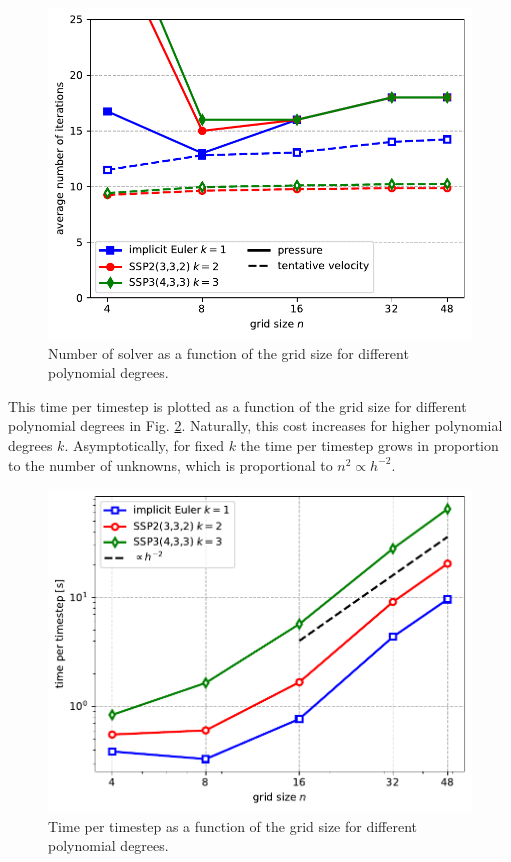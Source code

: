 \documentclass[11pt]{article}
\begin{document}
\begin{figure}
    \begin{center}
        \includegraphics[width=0.75\linewidth]{figures/niter.pdf}
        \caption{Number of solver as a function of the grid size for different polynomial degrees.}
        \label{fig:niter}
    \end{center}
\end{figure}
This time per timestep is plotted as a function of the grid size for different polynomial degrees in Fig. \ref{fig:titer}. Naturally, this cost increases for higher polynomial degrees $k$. Asymptotically, for fixed $k$ the time per timestep grows in proportion to the number of unknowns, which is proportional to $n^2\propto h^{-2}$.
\begin{figure}
    \begin{center}
        \includegraphics[width=0.75\linewidth]{figures/ttimestep.pdf}
        \caption{Time per timestep as a function of the grid size for different polynomial degrees.}
        \label{fig:titer}
    \end{center}
\end{figure}
\end{document}
